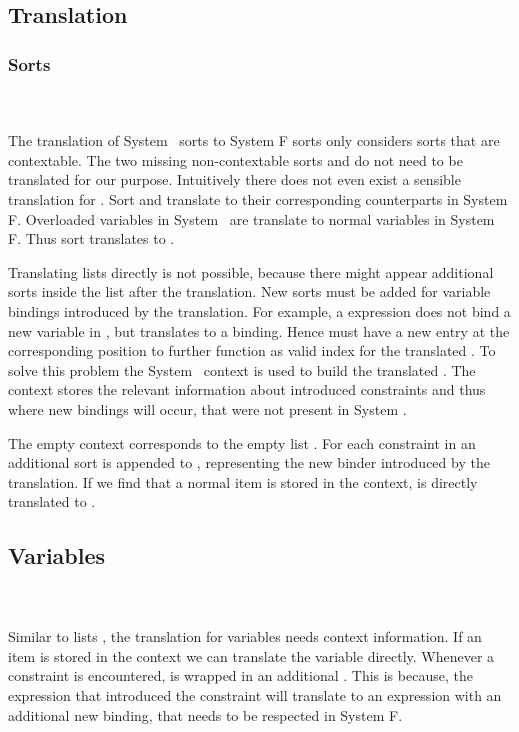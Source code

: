 \subsection{Translation}
\subsubsection{Sorts}\hfill\\\\
The translation of System \Fo\ sorts to System F sorts only considers sorts that are contextable. The two missing non-contextable sorts  and  do not need to be translated for our purpose. Intuitively there does not even exist a sensible translation for .
\DPTSort
Sort  and  translate to their corresponding counterparts in System F. Overloaded variables in System \Fo\ are translate to normal variables in System F. Thus sort  translates to . 

\noindent Translating lists  directly is not possible, because there might appear additional sorts inside the list after the translation. 
New sorts must be added for variable bindings introduced by the translation. 
For example, a    \Constr{=}    expression does not bind a new variable in , but translates to a     binding. 
Hence  must have a new entry  at the corresponding position to further function as valid index for the translated . 
To solve this problem the System \Fo\ context  is used to build the translated . 
The context stores the relevant information about introduced constraints and thus where new bindings will occur, that were not present in System \Fo. 

\DPTSorts
The empty context  corresponds to the empty list \Constr{[]}.
For each constraint in  an additional sort  is appended to , representing the new binder introduced by the translation. If we find that a normal item is stored in the context,  is directly translated to  .

\subsection{Variables}\hfill\\\\
Similar to lists , the translation for variables  needs context information.  
\DPTVar
If an item is stored in the context we can translate the variable directly. 
Whenever a constraint is encountered,  is wrapped in an additional . This is because, the expression that introduced the constraint will translate to an expression with an additional new binding, that needs to be respected in System F.

